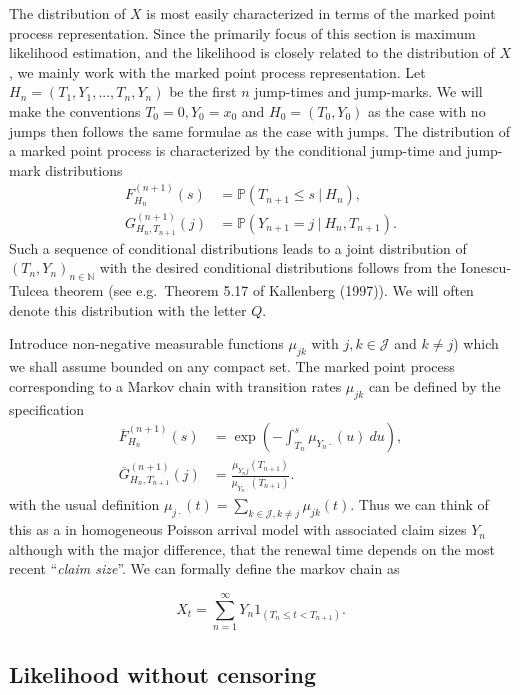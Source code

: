 \documentclass[a4paper,10pt,openany]{book}
\begin{document}
The distribution of \(X\) is most easily characterized in terms of the marked point process representation. Since the primarily focus of this section is maximum likelihood estimation, and the likelihood is closely related to the distribution of \(X\), we mainly work with the marked point process representation. Let \(H_n = (T_1,Y_1,...,T_n,Y_n)\) be the first \(n\) jump-times and jump-marks. We will make the conventions \(T_0 = 0, Y_0 = x_0\) and \(H_0 = (T_0,Y_0)\) as the case with no jumps then follows the same formulae as the case with jumps. The distribution of a marked point process is characterized by the conditional jump-time and jump-mark distributions
\begin{align*}
F_{H_n}^{(n+1)}(s)&=\mathbb P(T_{n+1} \le s\ \vert\ H_n),\\
G_{H_n,T_{n+1}}^{(n+1)}(j)&=\mathbb P(Y_{n+1} = j\ \vert\ H_n,T_{n+1}).
\end{align*}
Such a sequence of conditional distributions leads to a joint distribution of \((T_n,Y_n)_{n\in\mathbb N}\) with the desired conditional distributions follows from the Ionescu-Tulcea theorem (see e.g.~Theorem 5.17 of Kallenberg (1997)). We will often denote this distribution with the letter \(Q\).

Introduce non-negative measurable functions \(\mu_{jk}\) with \(j,k \in \mathcal J\) and \(k\ne j\)) which we shall assume bounded on any compact set. The marked point process corresponding to a Markov chain with transition rates \(\mu_{jk}\) can be defined by the specification
\begin{align*}
\overline F_{H_n}^{(n+1)}(s)&=\exp\left(-\int_{T_n}^s\mu_{Y_n\cdot}(u)\ du \right),\\
\overline G_{H_n,T_{n+1}}^{(n+1)}(j)&=\frac{\mu_{Y_nj}(T_{n+1})}{\mu_{Y_n\cdot}(T_{n+1})}.
\end{align*}
with the usual definition \(\mu_{j\cdot}(t)=\sum_{k\in \mathcal J, k\ne j}\mu_{jk}(t)\). Thus we can think of this as a in homogeneous Poisson arrival model with associated claim sizes \(Y_n\) although with the major difference, that the renewal time depends on the most recent ``\emph{claim size}''. We can formally define the markov chain as

\[
X_t=\sum_{n=1}^\infty Y_n1_{(T_n\le t <T_{n+1})}.
\]

\hypertarget{likelihood-without-censoring}{%
\subsection{Likelihood without censoring}\label{likelihood-without-censoring}}
\end{document}
